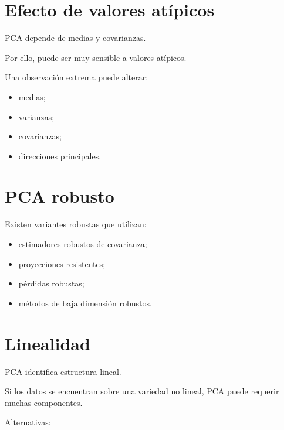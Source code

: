 \documentclass[
  spanish,
  10.5pt,
  letterpaper,
  DIV=11,
  numbers=noendperiod,
  oneside,
  open=any]{scrreprt}
\providecommand{\tightlist}{%
  \setlength{\itemsep}{0pt}\setlength{\parskip}{0pt}}
\theoremstyle{definition}
\theoremstyle{definition}
\theoremstyle{plain}
\theoremstyle{remark}
\begin{document}
\section*{Efecto de valores
atípicos}\label{efecto-de-valores-atuxedpicos}


PCA depende de medias y covarianzas.

Por ello, puede ser muy sensible a valores atípicos.

Una observación extrema puede alterar:

\begin{itemize}
\tightlist
\item
  medias;
\item
  varianzas;
\item
  covarianzas;
\item
  direcciones principales.
\end{itemize}

\section*{PCA robusto}\label{pca-robusto}


Existen variantes robustas que utilizan:

\begin{itemize}
\tightlist
\item
  estimadores robustos de covarianza;
\item
  proyecciones resistentes;
\item
  pérdidas robustas;
\item
  métodos de baja dimensión robustos.
\end{itemize}

\section*{Linealidad}\label{linealidad-1}


PCA identifica estructura lineal.

Si los datos se encuentran sobre una variedad no lineal, PCA puede
requerir muchas componentes.

Alternativas:
\end{document}
